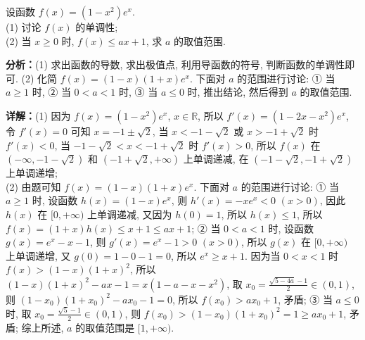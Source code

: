 \begin{question}[points=12]
设函数 $f(x)=(1-x^2)e^x$. \\ (1) 讨论 $f(x)$ 的单调性; \\ (2) 当 $x\ge0$ 时, $f(x)\le ax+1$, 求 $a$ 的取值范围.
\begin{solution}

\textbf{分析：}(1) 求出函数的导数, 求出极值点, 利用导函数的符号, 判断函数的单调性即可. (2) 化简 $f(x)=(1-x)(1+x)e^x$. 下面对 $a$ 的范围进行讨论: ① 当 $a\ge1$ 时, ② 当 $0<a<1$ 时, ③ 当 $a\le0$ 时, 推出结论, 然后得到 $a$ 的取值范围.

\textbf{详解：}(1) 因为 $f(x)=(1-x^2)e^x$, $x\in\mathbb{R}$, 所以 $f'(x)=(1-2x-x^2)e^x$, 令 $f'(x)=0$ 可知 $x=-1\pm\sqrt{2}$, 当 $x<-1-\sqrt{2}$ 或 $x>-1+\sqrt{2}$ 时 $f'(x)<0$, 当 $-1-\sqrt{2}<x<-1+\sqrt{2}$ 时 $f'(x)>0$, 所以 $f(x)$ 在 $(-\infty,-1-\sqrt{2})$ 和 $(-1+\sqrt{2},+\infty)$ 上单调递减, 在 $(-1-\sqrt{2},-1+\sqrt{2})$ 上单调递增; \\ (2) 由题可知 $f(x)=(1-x)(1+x)e^x$. 下面对 $a$ 的范围进行讨论: ① 当 $a\ge1$ 时, 设函数 $h(x)=(1-x)e^x$, 则 $h'(x)=-xe^x<0$ $(x>0)$, 因此 $h(x)$ 在 $[0,+\infty)$ 上单调递减, 又因为 $h(0)=1$, 所以 $h(x)\le1$, 所以 $f(x)=(1+x)h(x)\le x+1\le ax+1$; ② 当 $0<a<1$ 时, 设函数 $g(x)=e^x-x-1$, 则 $g'(x)=e^x-1>0$ $(x>0)$, 所以 $g(x)$ 在 $[0,+\infty)$ 上单调递增, 又 $g(0)=1-0-1=0$, 所以 $e^x\ge x+1$. 因为当 $0<x<1$ 时 $f(x)>(1-x)(1+x)^2$, 所以 $(1-x)(1+x)^2-ax-1=x(1-a-x-x^2)$, 取 $x_0=\frac{\sqrt{5-4a}-1}{2}\in(0,1)$, 则 $(1-x_0)(1+x_0)^2-ax_0-1=0$, 所以 $f(x_0)>ax_0+1$, 矛盾; ③ 当 $a\le0$ 时, 取 $x_0=\frac{\sqrt{5}-1}{2}\in(0,1)$, 则 $f(x_0)>(1-x_0)(1+x_0)^2=1\ge ax_0+1$, 矛盾; 综上所述, $a$ 的取值范围是 $[1,+\infty)$.
\end{solution}
\end{question}

